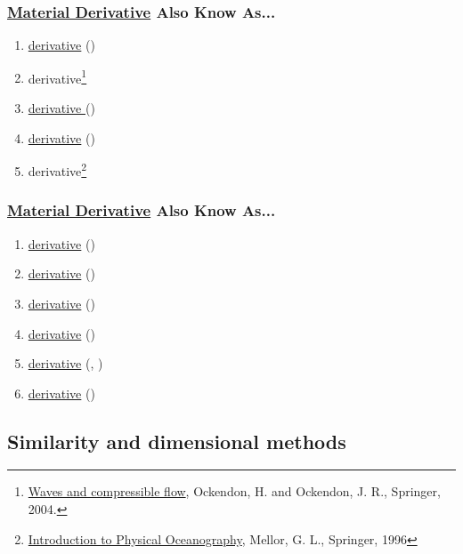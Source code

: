 \begin{frame}\frametitle{\href{https://en.wikipedia.org/wiki/Material_derivative}{Material Derivative} Also Know As...}
\begin{enumerate}
	\item \href{https://bookstore.ams.org/view?ProductCode=CLN/9}{ derivative} (\cite{majda2003introduction})
	\item {} derivative\footnote{\href{https://link.springer.com/book/10.1007/b97537}{Waves and compressible flow}, Ockendon, H. and Ockendon, J. R., Springer, 2004.} 
	\item \href{https://www.google.com/books/edition/Transport_Phenomena/L5FnNlIaGfcC?hl=en}{derivative } (\cite{bird2002transport})
	\item \href{https://www.google.com/books/edition/Transport_Phenomena/L5FnNlIaGfcC?hl=en}{ derivative} (\cite{bird2002transport})
	\item {} derivative\footnote{\href{https://link.springer.com/book/9781563962103}{Introduction to Physical Oceanography}, Mellor, G. L., Springer, 1996}
	\seti
\end{enumerate}
\end{frame}
%
\begin{frame}\frametitle{\href{https://en.wikipedia.org/wiki/Material_derivative}{Material Derivative} Also Know As...}
\begin{enumerate}
	\conti
	\item \href{}{ derivative} (\cite{stoker1992water})
	\item \href{}{ derivative} (\cite{bird2002transport})
	\item \href{}{ derivative} (\cite{granger1995fluid})
	\item \href{}{ derivative} (\cite{granger1995fluid})
	\item \href{}{ derivative} (\cite{bird2002transport}, \cite{landau1959fluid})
	\item \href{https://www.cambridge.org/core/books/gauge-field-theories/BFDECE4B2C0FE428C540232E36D39288}{ derivative} (\cite{pokorski2000gauge})
\end{enumerate}
\end{frame}
%
%
\subsection{Similarity and dimensional methods}

